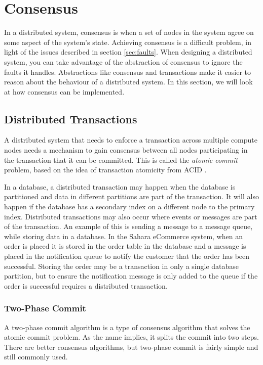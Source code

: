 \section{Consensus}

In a distributed system, consensus is when a set of nodes in the system agree on some aspect of the system's state.
Achieving consensus is a difficult problem, in light of the issues described in section \ref{sec:faults}.
When designing a distributed system, you can take advantage of the abstraction of consensus to ignore the faults it handles.
Abstractions like consensus and transactions \cite{distributed2-notes} make it easier to reason about the behaviour of a distributed system.
In this section, we will look at how consensus can be implemented.

\subsection{Distributed Transactions}

A distributed system that needs to enforce a transaction across multiple compute nodes
needs a mechanism to gain consensus between all nodes participating in the transaction that it can be committed.
This is called the \emph{atomic commit} problem, based on the idea of transaction atomicity from ACID \cite{distributed2-notes}.

In a database, a distributed transaction may happen when the database is partitioned and data in different partitions are part of the transaction.
It will also happen if the database has a secondary index on a different node to the primary index.
Distributed transactions may also occur where events or messages are part of the transaction.
An example of this is sending a message to a message queue, while storing data in a database.
In the Sahara eCommerce system, when an order is placed it is stored in the order table in the database
and a message is placed in the notification queue to notify the customer that the order has been successful.
Storing the order may be a transaction in only a single database partition,
but to ensure the notification message is only added to the queue if the order is successful requires a distributed transaction.

\subsubsection{Two-Phase Commit}
A two-phase commit algorithm is a type of consensus algorithm that solves the atomic commit problem.
As the name implies, it splits the commit into two steps.
There are better consensus algorithms, but two-phase commit is fairly simple and still commonly used.

